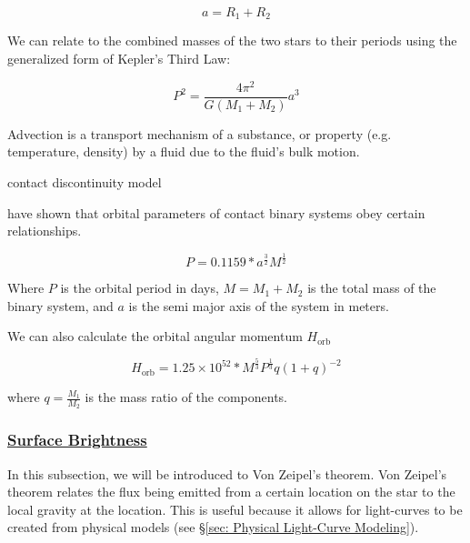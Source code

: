 \documentclass[12pt]{article} %
\numberwithin{equation}{section} %
\begin{document}
\begin{equation} \label{eqn: contact_criterion}
a = R_{1} + R_{2}
\end{equation}

We can relate to the combined masses of the two stars to their periods using the generalized form of Kepler's Third Law: 

\begin{equation} \label{eqn: kepler3}
P^{2} = \frac{4\pi^{2}}{G(M_{1} + M_{2})} a^{3}
\end{equation}

Advection is a transport mechanism of a substance, or property (e.g. temperature, density) by a fluid due to the fluid's bulk motion.

\citep{shu1976structure} contact discontinuity model

\citep{lubow1977structure}

\citet{gazeas2008angular} have shown that orbital parameters of contact binary systems obey certain relationships.

\begin{equation} \label{gazeas2008angular_6}
P = 0.1159 * a^{\frac{3}{2}} M^{\frac{1}{2}}
\end{equation}

Where $P$ is the orbital period in days, $M = M_{1} + M_{2}$ is the total mass of the binary system, and $a$ is the semi major axis of the system in meters.

We can also calculate the orbital angular momentum $H_{\text{orb}}$ 

\begin{equation} \label{gazeas2008angular_7}
H_{\text{orb}} = 1.25 \times 10^{52} * M^{\frac{5}{3}} P^{\frac{1}{3}} q(1 + q)^{-2}
\end{equation}

where $q = \frac{M_{1}}{M_{2}}$ is the mass ratio of the components.

\subsubsection[Surface Brightness]{\hyperlink{toc}{Surface Brightness}} \label{sec: Surface Brightness}

In this subsection, we will be introduced to Von Zeipel's theorem. Von Zeipel's theorem relates the flux being emitted from a certain location on the star to the local gravity at the location. This is useful because it allows for light-curves to be created from physical models (see \S\ref{sec: Physical Light-Curve Modeling}). 
\end{document}
